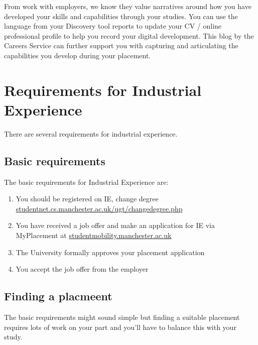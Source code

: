 \documentclass[
]{book}
\providecommand{\tightlist}{%
  \setlength{\itemsep}{0pt}\setlength{\parskip}{0pt}}
\begin{document}
From work with employers, we know they value narratives around how you have developed your skills and capabilities through your studies. You can use the language from your Discovery tool reports to update your CV / online professional profile to help you record your digital development. This blog by the Careers Service can further support you with capturing and articulating the capabilities you develop during your placement. \citep{conway}

\chapter{Requirements for Industrial Experience}\label{requirements-for-industrial-experience}

There are several requirements for industrial experience.

\section{Basic requirements}\label{basic}

The basic requirements for Industrial Experience are:

\begin{enumerate}
\def\labelenumi{\arabic{enumi}.}
\tightlist
\item
  You should be registered on IE, change degree \href{https://studentnet.cs.manchester.ac.uk/ugt/changedegree.php}{studentnet.cs.manchester.ac.uk/ugt/changedegree.php}
\item
  You have received a job offer and make an application for IE via MyPlacement at \href{https://studentmobility.manchester.ac.uk}{studentmobility.manchester.ac.uk}
\item
  The University formally approves your placement application
\item
  You accept the job offer from the employer
\end{enumerate}

\section{Finding a placmeent}\label{fin}

The basic requirements might sound simple but finding a suitable placement requires lots of work on your part and you'll have to balance this with your study.
\end{document}
